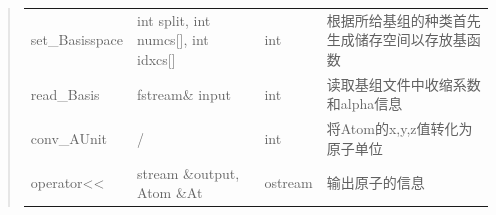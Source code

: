\documentclass[11pt]{article}
\begin{document}
\begin{quote}
\begin{longtable}[]{@{}llll@{}}
\begin{minipage}[t]{0.11\columnwidth}
set\_Basisspace\strut
\end{minipage} & \begin{minipage}[t]{0.28\columnwidth}\raggedright\strut
int split, int numcs{[}{]}, int idxcs{[}{]}\strut
\end{minipage} & \begin{minipage}[t]{0.06\columnwidth}\raggedright\strut
int\strut
\end{minipage} & \begin{minipage}[t]{0.43\columnwidth}\raggedright\strut
根据所给基组的种类首先生成储存空间以存放基函数\strut
\end{minipage}\tabularnewline
\begin{minipage}[t]{0.11\columnwidth}\raggedright\strut
read\_Basis\strut
\end{minipage} & \begin{minipage}[t]{0.28\columnwidth}\raggedright\strut
fstream\& input\strut
\end{minipage} & \begin{minipage}[t]{0.06\columnwidth}\raggedright\strut
int\strut
\end{minipage} & \begin{minipage}[t]{0.43\columnwidth}\raggedright\strut
读取基组文件中收缩系数和alpha信息\strut
\end{minipage}\tabularnewline
\begin{minipage}[t]{0.11\columnwidth}\raggedright\strut
conv\_AUnit\strut
\end{minipage} & \begin{minipage}[t]{0.28\columnwidth}\raggedright\strut
/\strut
\end{minipage} & \begin{minipage}[t]{0.06\columnwidth}\raggedright\strut
int\strut
\end{minipage} & \begin{minipage}[t]{0.43\columnwidth}\raggedright\strut
将Atom的x,y,z值转化为原子单位\strut
\end{minipage}\tabularnewline
\begin{minipage}[t]{0.11\columnwidth}\raggedright\strut
operator\textless{}\textless{}\strut
\end{minipage} & \begin{minipage}[t]{0.28\columnwidth}\raggedright\strut
stream \&output, Atom \&At\strut
\end{minipage} & \begin{minipage}[t]{0.06\columnwidth}\raggedright\strut
ostream\strut
\end{minipage} & \begin{minipage}[t]{0.43\columnwidth}\raggedright\strut
输出原子的信息\strut
\end{minipage}\tabularnewline
\bottomrule
\end{longtable}
\end{quote}
\end{document}
